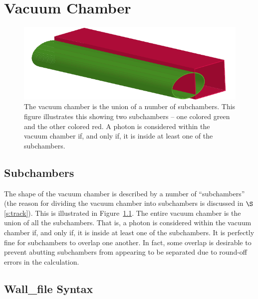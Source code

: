 \documentclass[11pt,openany]{report}
\newcommand{\sref}[1]{$\S$\ref{#1}}
\newcommand{\fig}[1]{Figure~\ref{#1}}
\begin{document}
\chapter{Vacuum Chamber} 
\label{s:vac.chamber}

\begin{figure}[bt]
\begin{center}
\includegraphics[width=5in]{vac-pipe.pdf} \caption[The vacuum chamber is the union of a
number of subchambers.]{The vacuum chamber is the union of a number of subchambers.
This figure illustrates this showing two subchambers -- one colored green and the other
colored red. A photon is considered within the vacuum chamber if, and only if, it is
inside at least one of the subchambers.}
\label{f:vac-chamber}
\end{center}
\end{figure}

\section{Subchambers}
\label{s:sub.chambers}

The shape of the vacuum chamber is described by a number of ``subchambers'' (the reason
for dividing the vacuum chamber into subchambers is discussed in \sref{s:track}). This is
illustrated in \fig{f:vac-chamber}. The entire vacuum chamber is the union of all the
subchambers. That is, a photon is considered within the vacuum chamber if, and only if,
it is inside at least one of the subchambers. It is perfectly fine for subchambers to
overlap one another. In fact, some overlap is desirable to prevent abutting subchambers
from appearing to be separated due to round-off errors in the calculation.

\section{Wall_file Syntax}
\label{s:wall.file}
\end{document}
